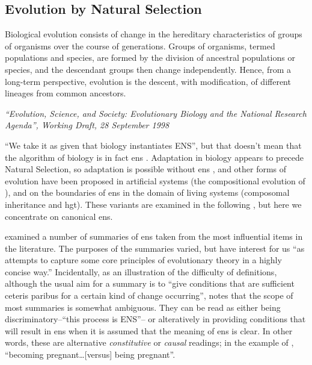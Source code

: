 \subsection{Evolution by Natural Selection}\label{evolution-by-natural-selection}

\epigraph{%
	Biological evolution consists of change in the hereditary characteristics of groups of organisms over the course of generations. Groups of organisms, termed populations and species, are formed by the division of ancestral populations or species, and the descendant groups then change independently. Hence, from a long-term perspective, evolution is the descent, with modification, of different lineages from common ancestors.}{\textit{``Evolution, Science, and Society: Evolutionary Biology and the National Research Agenda'', Working Draft, 28 September 1998}}

``We take it as given that biology instantiates ENS'', but that doesn't mean that the algorithm of biology is in fact \gls{ens} \parencite{Watson2012}. Adaptation in biology appears to precede Natural Selection, so adaptation is possible without \gls{ens} \parencite{Watson2010}, and other forms of evolution have been proposed in artificial systems (\eg the compositional evolution of \textcite{Arthur2009}), and on the boundaries of \gls{ens} in the domain of living systems (\eg composomal inheritance and \gls{hgt}). These variants are examined in the following , but here we concentrate on canonical \gls{ens}.

\Textcite{Godfrey-Smith2007} examined a number of summaries of \gls{ens} taken from the most influential items in the literature. The purposes of the summaries varied, but have interest for us ``as attempts to capture some core principles of evolutionary theory in a highly concise way.'' Incidentally, as an illustration of the difficulty of definitions, although the usual aim for a summary is to ``give conditions that are sufficient ceteris paribus for a certain kind of change occurring'', \textcite{Godfrey-Smith2007} notes that the scope of most summaries is somewhat ambiguous. They can be read as either being discriminatory--``this process is ENS''-- or alteratively in providing conditions that will result in \gls{ens} when it is assumed that the meaning of \gls{ens} is clear. In other words, these are alternative \emph{constitutive} or \emph{causal} readings; in the example of \textcite{Godfrey-Smith2007}, ``becoming pregnant\ldots{}{[}versus{]} being pregnant''.

